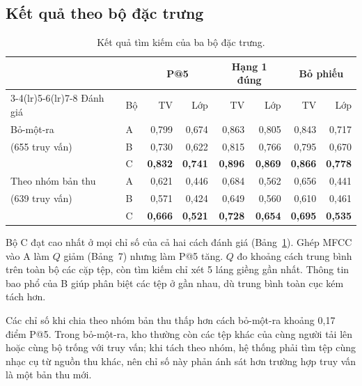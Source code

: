 \documentclass[11pt,a4paper]{article}
\begin{document}
\subsection{Kết quả theo bộ đặc trưng}
\begin{table}[htbp]
\centering\small
\caption{Kết quả tìm kiếm của ba bộ đặc trưng.}\label{tab:ketqua}
\begin{tabular}{llrrrrrr}
\toprule
& & \multicolumn{2}{c}{P@5} & \multicolumn{2}{c}{Hạng 1 đúng} & \multicolumn{2}{c}{Bỏ phiếu}\\
\cmidrule(lr){3-4}\cmidrule(lr){5-6}\cmidrule(lr){7-8}
Đánh giá & Bộ & TV & Lớp & TV & Lớp & TV & Lớp\\\midrule
Bỏ-một-ra & A & 0,799 & 0,674 & 0,863 & 0,805 & 0,843 & 0,717\\
(655 truy vấn) & B & 0,730 & 0,622 & 0,815 & 0,766 & 0,795 & 0,670\\
& C & \textbf{0,832} & \textbf{0,741} & \textbf{0,896} & \textbf{0,869} & \textbf{0,866} & \textbf{0,778}\\\midrule
Theo nhóm bản thu & A & 0,621 & 0,446 & 0,684 & 0,562 & 0,656 & 0,441\\
(639 truy vấn) & B & 0,571 & 0,424 & 0,649 & 0,560 & 0,610 & 0,461\\
& C & \textbf{0,666} & \textbf{0,521} & \textbf{0,728} & \textbf{0,654} & \textbf{0,695} & \textbf{0,535}\\\bottomrule
\end{tabular}
\end{table}
Bộ C đạt cao nhất ở mọi chỉ số của cả hai cách đánh giá (Bảng~\ref{tab:ketqua}). Ghép MFCC vào A làm $Q$ giảm (Bảng~7) nhưng làm P@5 tăng. $Q$ đo khoảng cách trung bình trên toàn bộ các cặp tệp, còn tìm kiếm chỉ xét 5 láng giềng gần nhất. Thông tin bao phổ của B giúp phân biệt các tệp ở gần nhau, dù trung bình toàn cục kém tách hơn.

Các chỉ số khi chia theo nhóm bản thu thấp hơn cách bỏ-một-ra khoảng 0,17 điểm P@5. Trong bỏ-một-ra, kho thường còn các tệp khác của cùng người tải lên hoặc cùng bộ trống với truy vấn; khi tách theo nhóm, hệ thống phải tìm tệp cùng nhạc cụ từ nguồn thu khác, nên chỉ số này phản ánh sát hơn trường hợp truy vấn là một bản thu mới.
\end{document}
